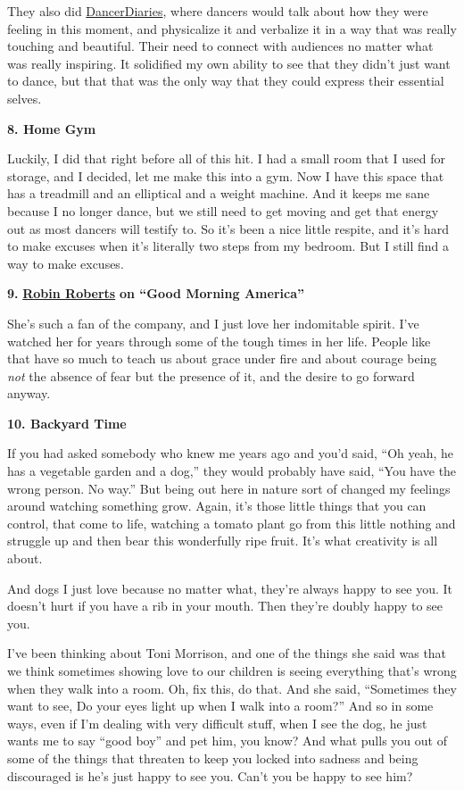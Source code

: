 They also did
\href{https://www.youtube.com/watch?v=bOio57DuiUM\&list=PLSYS-T-WpOEUSAdXYrZw-zaZam_UMxJ7r}{DancerDiaries},
where dancers would talk about how they were feeling in this moment, and
physicalize it and verbalize it in a way that was really touching and
beautiful. Their need to connect with audiences no matter what was
really inspiring. It solidified my own ability to see that they didn't
just want to dance, but that that was the only way that they could
express their essential selves.

\textbf{8. Home Gym}

Luckily, I did that right before all of this hit. I had a small room
that I used for storage, and I decided, let me make this into a gym. Now
I have this space that has a treadmill and an elliptical and a weight
machine. And it keeps me sane because I no longer dance, but we still
need to get moving and get that energy out as most dancers will testify
to. So it's been a nice little respite, and it's hard to make excuses
when it's literally two steps from my bedroom. But I still find a way to
make excuses.

\textbf{9.}
\textbf{\href{https://twitter.com/RobinRoberts?ref_src=twsrc\%5Egoogle\%7Ctwcamp\%5Eserp\%7Ctwgr\%5Eauthor}{Robin
Roberts}} \textbf{on ``Good Morning America''}

She's such a fan of the company, and I just love her indomitable spirit.
I've watched her for years through some of the tough times in her life.
People like that have so much to teach us about grace under fire and
about courage being \emph{not} the absence of fear but the presence of
it, and the desire to go forward anyway.

\textbf{10. Backyard Time}

If you had asked somebody who knew me years ago and you'd said, ``Oh
yeah, he has a vegetable garden and a dog,'' they would probably have
said, ``You have the wrong person. No way.'' But being out here in
nature sort of changed my feelings around watching something grow.
Again, it's those little things that you can control, that come to life,
watching a tomato plant go from this little nothing and struggle up and
then bear this wonderfully ripe fruit. It's what creativity is all
about.

And dogs I just love because no matter what, they're always happy to see
you. It doesn't hurt if you have a rib in your mouth. Then they're
doubly happy to see you.

I've been thinking about Toni Morrison, and one of the things she said
was that we think sometimes showing love to our children is seeing
everything that's wrong when they walk into a room. Oh, fix this, do
that. And she said, ``Sometimes they want to see, Do your eyes light up
when I walk into a room?'' And so in some ways, even if I'm dealing with
very difficult stuff, when I see the dog, he just wants me to say ``good
boy'' and pet him, you know? And what pulls you out of some of the
things that threaten to keep you locked into sadness and being
discouraged is he's just happy to see you. Can't you be happy to see
him?

